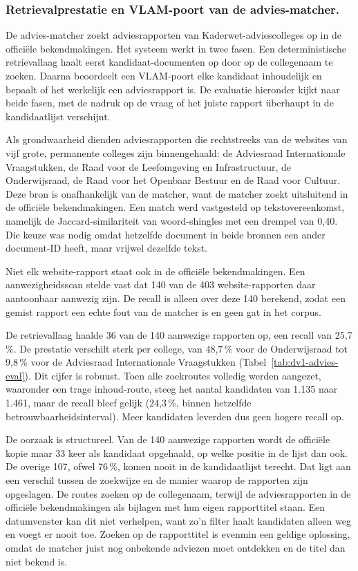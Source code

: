 \subsubsection{Retrievalprestatie en VLAM-poort van de advies-matcher.}
De advies-matcher zoekt adviesrapporten van Kaderwet-adviescolleges op in de
officiële bekendmakingen. Het systeem werkt in twee fasen. Een deterministische
retrievallaag haalt eerst kandidaat-documenten op door op de collegenaam te zoeken.
Daarna beoordeelt een VLAM-poort elke kandidaat inhoudelijk en bepaalt of het
werkelijk een adviesrapport is. De evaluatie hieronder kijkt naar beide fasen, met
de nadruk op de vraag of het juiste rapport \"uberhaupt in de kandidaatlijst
verschijnt.

\noindent Als grondwaarheid dienden adviesrapporten die rechtstreeks van de websites
van vijf grote, permanente colleges zijn binnengehaald: de Adviesraad Internationale
Vraagstukken, de Raad voor de Leefomgeving en Infrastructuur, de Onderwijsraad, de
Raad voor het Openbaar Bestuur en de Raad voor Cultuur. Deze bron is onafhankelijk
van de matcher, want de matcher zoekt uitsluitend in de officiële bekendmakingen.
Een match werd vastgesteld op tekstovereenkomst, namelijk de Jaccard-similariteit van
woord-shingles met een drempel van 0,40. Die keuze was nodig omdat hetzelfde document
in beide bronnen een ander document-ID heeft, maar vrijwel dezelfde tekst.

\noindent Niet elk website-rapport staat ook in de officiële bekendmakingen. Een
aanwezigheidsscan stelde vast dat 140 van de 403 website-rapporten daar aantoonbaar
aanwezig zijn. De recall is alleen over deze 140 berekend, zodat een gemist rapport
een echte fout van de matcher is en geen gat in het corpus.

\noindent De retrievallaag haalde 36 van de 140 aanwezige rapporten op, een recall van
25,7\,\%. De prestatie verschilt sterk per college, van 48,7\,\% voor de Onderwijsraad
tot 9,8\,\% voor de Adviesraad Internationale Vraagstukken
(Tabel~\ref{tab:dv1-advies-eval}). Dit cijfer is robuust. Toen alle zoekroutes
volledig werden aangezet, waaronder een trage inhoud-route, steeg het aantal
kandidaten van 1.135 naar 1.461, maar de recall bleef gelijk (24,3\,\%, binnen
hetzelfde betrouwbaarheidsinterval). Meer kandidaten leverden dus geen hogere recall op.

\noindent De oorzaak is structureel. Van de 140 aanwezige rapporten wordt de officiële
kopie maar 33 keer als kandidaat opgehaald, op welke positie in de lijst dan ook. De
overige 107, ofwel 76\,\%, komen nooit in de kandidaatlijst terecht. Dat ligt aan een
verschil tussen de zoekwijze en de manier waarop de rapporten zijn opgeslagen. De
routes zoeken op de collegenaam, terwijl de adviesrapporten in de officiële
bekendmakingen als bijlagen met hun eigen rapporttitel staan. Een datumvenster kan dit
niet verhelpen, want zo'n filter haalt kandidaten alleen weg en voegt er nooit toe.
Zoeken op de rapporttitel is evenmin een geldige oplossing, omdat de matcher juist nog
onbekende adviezen moet ontdekken en de titel dan niet bekend is.

